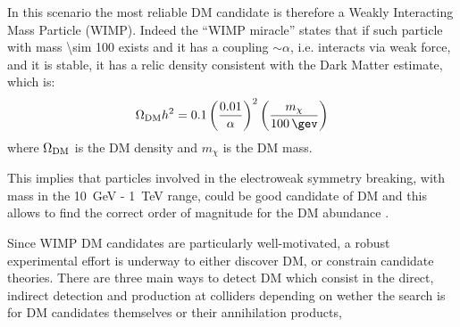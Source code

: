 In this scenario the most reliable DM candidate is therefore a Weakly Interacting Mass Particle (WIMP). Indeed the ``WIMP miracle'' states that if such particle with mass \SI{\sim 100}{\gev} exists and it has a coupling $\sim \alpha$, i.e. interacts via weak force, and it is stable, it has a relic density consistent with the Dark Matter estimate, which is:
\begin{equation}
	\Omega_\textup{DM}h^2=0.1\left(\frac{0.01}{\alpha}\right)^2\left(\frac{m_\chi}{\SI{100}{\gev}}\right)
\end{equation}
\enlargethispage{1\baselineskip}
where $\Omega_\textup{DM}$ is the DM density and $m_\chi$ is the DM mass.

This implies that particles involved in the electroweak symmetry breaking, with mass in the \SI{10}{\GeV} - \SI{1}{\TeV} range, could be good candidate of DM and this allows to find the correct order of magnitude for the DM abundance \cite{DMcollider}.





Since WIMP DM candidates are particularly well-motivated, a robust experimental effort is underway to either discover DM, or constrain candidate theories. There are three main ways to detect DM which consist in the direct, indirect detection and production at colliders depending on wether the search is for DM candidates themselves or their annihilation products,

